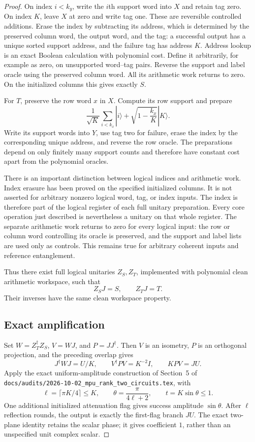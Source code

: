 \documentclass[11pt]{article}
\begin{document}
\begin{proof}
On index $i<k_y$, write the $i$th support word into $X$
and retain tag zero. On index $K$, leave $X$ at zero
and write tag one. These are reversible controlled
additions. Erase the index by subtracting its address,
which is determined by the preserved column word, the
output word, and the tag: a successful output has a
unique sorted support address, and the failure tag has
address $K$. Address lookup is an exact Boolean
calculation with polynomial cost. Define it arbitrarily,
for example as zero, on unsupported word--tag pairs.
Reverse the support and label oracle using the preserved
column word. All its arithmetic work returns to zero.
On the initialized columns this gives exactly $S$.

For $T$, preserve the row word $x$ in $X$. Compute its
row support and prepare
\[
 \frac1{\sqrt K}\sum_{i<k_x}|i\rangle
       +\sqrt{1-\frac{k_x}{K}}|K\rangle.
\]
Write its support words into $Y$, use tag two for failure,
erase the index by the corresponding unique address,
and reverse the row oracle. The preparations depend on
only finitely many support counts and therefore have
constant cost apart from the polynomial oracles.

There is an important distinction between logical indices
and arithmetic work. Index erasure has been proved on
the specified initialized columns. It is not asserted
for arbitrary nonzero logical word, tag, or index inputs.
The index is therefore part of the logical register of
each full unitary preparation. Every core operation just
described is nevertheless a unitary on that whole register.
The separate arithmetic work returns to zero for every
logical input: the row or column word controlling its
oracle is preserved, and the support and label lists are
used only as controls. This remains true for arbitrary
coherent inputs and reference entanglement.

Thus there exist full logical unitaries $Z_S,Z_T$,
implemented with polynomial clean arithmetic workspace,
such that
\[
 Z_SJ=S,\qquad Z_TJ=T.
\]
Their inverses have the same clean workspace property.

\subsection*{Exact amplification}

Set $W=Z_T^\dagger Z_S$, $V=WJ$, and $P=JJ^\dagger$.
Then $V$ is an isometry, $P$ is an orthogonal projection,
and the preceding overlap gives
\[
 J^\dagger WJ=U/K,\qquad
 V^\dagger PV=K^{-2}I,\qquad
 KPV=JU.
\]
Apply the exact uniform-amplitude construction of Section~5 of
\nolinkurl{docs/audits/2026-10-02_mpu_rank_two_circuits.tex}, with
\[
 \ell=\lceil\pi K/4\rceil\le K,\qquad
 \theta=\frac{\pi}{4\ell+2},\qquad t=K\sin\theta\le1.
\]
One additional initialized attenuation flag gives success
amplitude $\sin\theta$. After $\ell$ reflection rounds,
the output is exactly the first-flag branch $JU$.
The exact two-plane identity retains the scalar phase;
it gives coefficient $1$, rather than an unspecified
unit complex scalar.


\end{proof}
\end{document}
